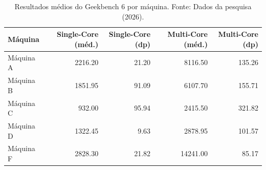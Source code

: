 \begin{table}[ht]
\centering
\caption{Resultados médios do Geekbench 6 por máquina. Fonte: Dados da pesquisa (2026).}
\label{tab:benchmark_comparativo}
\begin{tabular}{lrrrr}
\toprule
Máquina & Single-Core (méd.) & Single-Core (dp) & Multi-Core (méd.) & Multi-Core (dp) \\
\midrule
Máquina A & 2216.20 & 21.20 & 8116.50 & 135.26 \\
Máquina B & 1851.95 & 91.09 & 6107.70 & 155.71 \\
Máquina C & 932.00 & 95.94 & 2415.50 & 321.82 \\
Máquina D & 1322.45 & 9.63 & 2878.95 & 101.57 \\
Máquina F & 2828.30 & 21.82 & 14241.00 & 85.17 \\
\bottomrule
\end{tabular}
\end{table}
